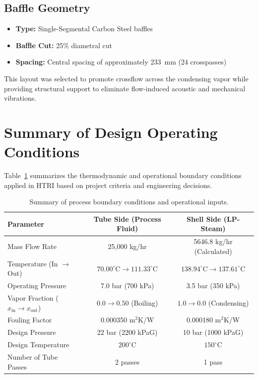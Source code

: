 \documentclass[12pt]{article}
\begin{document}
\subsection{Baffle Geometry}

\begin{itemize}
\item \textbf{Type:} Single-Segmental Carbon Steel baffles
\item \textbf{Baffle Cut:} 25\% diametral cut
\item \textbf{Spacing:} Central spacing of approximately 233~mm (24 crosspasses)
\end{itemize}

This layout was selected to promote crossflow across the condensing vapor while providing structural support to eliminate flow-induced acoustic and mechanical vibrations.

\section{Summary of Design Operating Conditions}

Table~\ref{tab:operating_conditions} summarizes the thermodynamic and operational boundary conditions applied in HTRI based on project criteria and engineering decisions.

\begin{table}[H]
\centering
\small
\begin{tabular}{lcc}
\toprule
\textbf{Parameter} & \textbf{Tube Side (Process Fluid)} & \textbf{Shell Side (LP-Steam)} \\
\midrule
Mass Flow Rate & 25{,}000 kg/hr & 5646.8 kg/hr (Calculated) \\
Temperature (In $\to$ Out) & $70.00^\circ\text{C} \to 111.33^\circ\text{C}$ & $138.94^\circ\text{C} \to 137.61^\circ\text{C}$ \\
Operating Pressure & 7.0 bar (700 kPa) & 3.5 bar (350 kPa) \\
Vapor Fraction ($x_{\text{in}} \to x_{\text{out}}$) & $0.0 \to 0.50$ (Boiling) & $1.0 \to 0.0$ (Condensing) \\
Fouling Factor & 0.000350 m$^2$K/W & 0.000180 m$^2$K/W \\
Design Pressure & 22 bar (2200 kPaG) & 10 bar (1000 kPaG) \\
Design Temperature & $200^\circ\text{C}$ & $150^\circ\text{C}$ \\
Number of Tube Passes & 2 passes & 1 pass \\
\bottomrule
\end{tabular}
\caption{Summary of process boundary conditions and operational inputs.}
\label{tab:operating_conditions}
\end{table}
\end{document}
